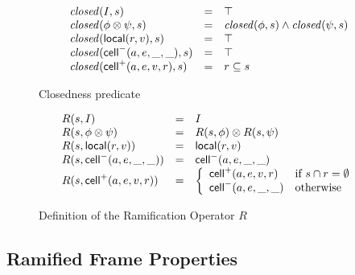 \begin{figure}
\mbox{}
  \begin{displaymath}
    \begin{array}{lcl}
      \mathit{closed}(I, s) & = & \top \\
      \mathit{closed}(\phi \otimes \psi, s) & = & \mathit{closed}(\phi, s) \land \mathit{closed}(\psi, s) \\ 
      \mathit{closed}(\mathsf{local}({r}, {v}), s) & = & \top \\
      \mathit{closed}(\mathsf{cell}^{-}({a}, {e}, {\_}, {\_}), s) & = & \top \\
      \mathit{closed}(\mathsf{cell}^{+}({a}, {e}, {v}, {r}), s) & = & r \subseteq s \\
    \end{array}
  \end{displaymath}
\caption{Closedness predicate}
\label{closedness}  
\end{figure}

\begin{figure}
\mbox{}
  \begin{displaymath}
    \begin{array}{lcl}
      R(s, I)                 & = & I \\
      R(s, \phi \otimes \psi) & = & R(s, \phi) \otimes R(s, \psi) \\
      R(s, \mathsf{local}({r}, {v}))   & = & \mathsf{local}({r}, {v}) \\
      R(s, \mathsf{cell}^{-}({a}, {e}, {\_}, {\_}))    & = & \mathsf{cell}^{-}({a}, {e}, {\_}, {\_}) \\
      R(s, \mathsf{cell}^{+}({a}, {e}, {v}, {r})) & = & \left\{\begin{array}{ll}
                                                \mathsf{cell}^{+}({a}, {e}, {v}, {r}) 
                                              & \mbox{if } s \cap r = \emptyset \\
                                                \mathsf{cell}^{-}({a}, {e}, {\_}, {\_})
                                              & \mbox{otherwise}
                                              \end{array}
                                       \right.
    \end{array}
  \end{displaymath}
\caption{Definition of the Ramification Operator $R$}
\label{ramify-def}
\end{figure}

\subsection{Ramified Frame Properties}

